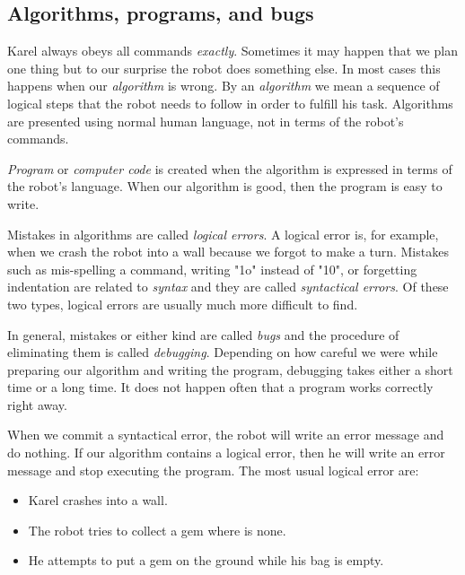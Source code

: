 \documentclass[article,A4,12pt]{llncs}
\begin{document}
\subsection{Algorithms, programs, and bugs} \label{subsec:interm1}

Karel always obeys all commands {\em exactly}. Sometimes it may happen that 
we plan one thing but to our surprise the robot does something else. In most cases this 
happens when our {\em algorithm} is wrong. By an {\em algorithm} we mean a sequence of 
logical steps that the robot needs to follow in order to fulfill his task. Algorithms 
are presented using normal human language, not in terms of the robot's commands. 

{\em Program} or {\em computer code} is created when the algorithm is expressed
in terms of the robot's language. When our algorithm is good, then 
the program is easy to write.

Mistakes in algorithms are called {\em logical errors}. A logical error is, for 
example, when we crash the robot into a wall because we forgot to make a turn.
Mistakes such as mis-spelling a command, writing "1o" instead of "10", or forgetting 
indentation are related to 
{\em syntax} and they are called {\em syntactical errors}. Of these two types, 
logical errors are usually much more difficult to find. 

In general, mistakes or either kind are called {\em bugs} and the procedure of 
eliminating them is called {\em debugging}. Depending on how careful we 
were while preparing our algorithm and writing the program, debugging takes either 
a short time or a long time. It does not happen often that a program works correctly
right away. 

When we commit a syntactical error,
the robot will write an error message and do nothing.
If our algorithm contains a logical error, then he will
write an error message and stop executing the program. 
The most usual logical error are:

\begin{itemize}
\item Karel crashes into a wall.
\item The robot tries to collect a gem where is none.
\item He attempts to put a gem on the ground while his bag is empty.
\end{itemize}

\end{document}

